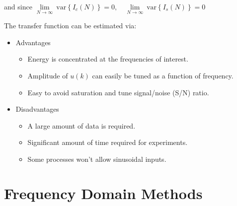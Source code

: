 \documentclass[10pt,a4paper]{scrartcl}
\begin{document}
\begin{multicols*}{2}
and since $\lim\limits_{N\rightarrow\infty}\ \text{var}\left\{I_c(N)\right\}=0,\quad\lim\limits_{N\rightarrow\infty}\ \text{var}\left\{I_s(N)\right\}=0$

The transfer function can be estimated via:


\begin{itemize}
\item Advantages
\begin{itemize}
\item Energy is concentrated at the frequencies of interest.
\item Amplitude of $u(k)$ can easily be tuned as a function of frequency.
\item Easy to avoid saturation and tune signal/noise (S/N) ratio.
\end{itemize}
\item Disadvantages
\begin{itemize}
\item A large amount of data is required.
\item Significant amount of time required for experiments.
\item Some processes won't allow sinusoidal inputs.
\end{itemize}
\end{itemize}

\section{Frequency Domain Methods}

%
%
%



\end{multicols*}
\end{document}
